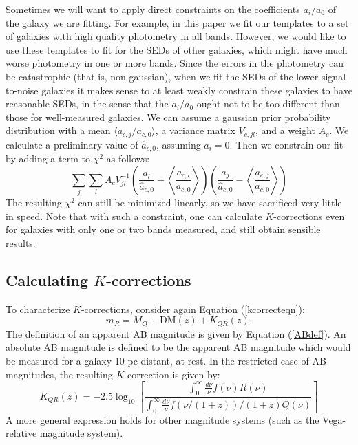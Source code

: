 \documentclass[10pt,preprint]{aastex}
\newcommand{\avg}[1]{{\langle{#1}\rangle}}
\newcommand{\Avg}[1]{{\left\langle{#1}\right\rangle}}
\begin{document}
Sometimes we will want to apply direct constraints on the coefficients
$a_i/a_0$ of the galaxy we are fitting. For example, in this paper we
fit our templates to a set of galaxies with high quality photometry in
all bands. However, we would like to use these templates to fit for
the SEDs of other galaxies, which might have much worse photometry in
one or more bands. Since the errors in the photometry can be
catastrophic (that is, non-gaussian), when we fit the SEDs of the
lower signal-to-noise galaxies it makes sense to at least weakly
constrain these galaxies to have reasonable SEDs, in the sense that
the $a_i/a_0$ ought not to be too different than those for
well-measured galaxies. We can assume a gaussian prior probability
distribution with a mean $\avg{a_{c,j}/a_{c,0}}$, a variance matrix
$V_{c,jl}$, and a weight $A_c$.  We calculate a preliminary value of
${\hat{a}}_{c,0}$, assuming $a_i = 0$. Then we constrain our fit by
adding a term to $\chi^2$ as follows:
\begin{equation}
\sum_j \sum_l A_c V^{-1}_{jl}
\left(\frac{a_l}{{\hat{a}}_{c,0}}-\Avg{\frac{a_{c,l}}{a_{c,0}}}\right)
\left(\frac{a_j}{{\hat{a}}_{c,0}}-\Avg{\frac{a_{c,j}}{a_{c,0}}}\right)
\end{equation}
The resulting $\chi^2$ can still be minimized linearly, so we have
sacrificed very little in speed.  Note that with such a constraint,
one can calculate $K$-corrections even for galaxies with only one or
two bands measured, and still obtain sensible results. 

\subsection{Calculating $K$-corrections}

To characterize $K$-corrections, consider again Equation
(\ref{kcorrecteqn}): 
\begin{equation}
m_R = M_Q + \mathrm{DM}(z) + K_{QR}(z).
\end{equation}
The definition of an apparent AB magnitude is given by Equation
(\ref{ABdef}). An absolute AB magnitude is defined to be the apparent
AB magnitude which would be measured for a galaxy 10 pc distant, at
rest.  In the restricted case of AB magnitudes, the resulting
$K$-correction is given by:
\begin{equation}
K_{QR}(z) = -2.5 \log_{10} \left[
\frac{
\int_0^{\infty} \frac{d\nu}{\nu} f(\nu) R(\nu)
}{
\int_0^{\infty} \frac{d\nu}{\nu} f(\nu/(1+z))/(1+z) Q(\nu)
}
\right]
\end{equation}
A more general expression holds for other magnitude systems (such as
the Vega-relative magnitude system). 
\end{document}

